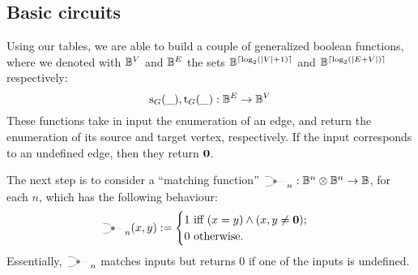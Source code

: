 \documentclass[submission,copyright,creativecommons,sharealike,noncommercial]{eptcs}
\begin{document}
\subsection{Basic circuits}
%
%
Using our tables, we are able to build a couple of generalized 
boolean functions, where we denoted with $\mathbb{B}^V$ and $\mathbb{B}^E$
the sets $\mathbb{B}^{ \lceil \log_2 (|V|+1) \rceil}$ and 
$\mathbb{B}^{\lceil \log_2 (|E+V|) \rceil}$ respectively:
%
%
\begin{equation*}
  \operatorname{s}_{G}(\_), \operatorname{t}_{G}(\_): \mathbb{B}^E \to \mathbb{B}^V 
\end{equation*}
%
These functions take in input the enumeration of an edge, 
and return the enumeration of its source and target vertex, respectively. 
If the input corresponds to an undefined edge, then they return $\textbf{0}$.

The next step is to consider a ``matching function'' 
$\MATCHSym_n: \Bool^n \Tensor \Bool^n \to \Bool$, for each $n$, 
which has the following behaviour:
%
%
\begin{equation*}
  \MATCHSym_n (x,y) := \begin{cases}
    1 \text{ iff } (x = y) \wedge (x,y \neq \Zero);\\
    0 \text{ otherwise}.
  \end{cases}
\end{equation*}
%
Essentially, $\MATCHSym_n$ matches inputs but returns $0$ if one 
of the inputs is undefined. 
\end{document}
